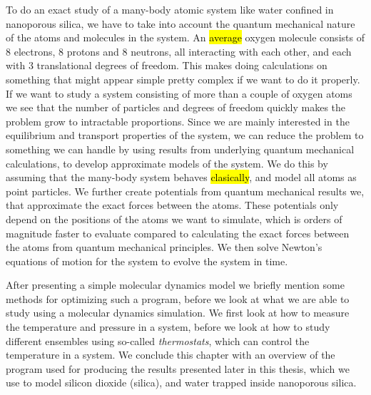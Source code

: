 To do an exact study of a many-body atomic system like water confined in nanoporous silica, we have to take into account the quantum mechanical nature of the atoms and molecules in the system. An \hl{average} oxygen molecule consists of 8 electrons, 8 protons and 8 neutrons, all interacting with each other, and each with 3 translational degrees of freedom. This makes doing calculations on something that might appear simple pretty complex if we want to do it properly. If we want to study a system consisting of more than a couple of oxygen atoms we see that the number of particles and degrees of freedom quickly makes the problem grow to intractable proportions. Since we are mainly interested in the equilibrium and transport properties of the system, we can reduce the problem to something we can handle by using results from underlying quantum mechanical calculations, to develop approximate models of the system. We do this by assuming that the many-body system behaves \hl{clasically}, and model all atoms as point particles. We further create potentials from quantum mechanical results we, that approximate the exact forces between the atoms. These potentials only depend on the positions of the atoms we want to simulate, which is orders of magnitude faster to evaluate compared to calculating the exact forces between the atoms from quantum mechanical principles. We then solve Newton's equations of motion for the system to evolve the system in time.


After presenting a simple molecular dynamics model we briefly mention some methods for optimizing such a program, before we look at what we are able to study using a molecular dynamics simulation. We first look at how to measure the temperature and pressure in a system, before we look at how to study different ensembles using so-called \emph{thermostats}, which can control the temperature in a system. We conclude this chapter with an overview of the program used for producing the results presented later in this thesis, which we use to model silicon dioxide (silica), and water trapped inside nanoporous silica.
